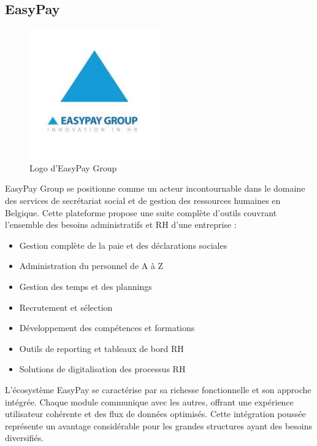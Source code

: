 \subsection{EasyPay}

\begin{figure}[H]
    \centering
    \includegraphics[width=0.5\textwidth]{easyPayLogo.jpeg}
    \caption{Logo d'EasyPay Group \cite{easypay}}
    \label{fig:easyPayLogo}
\end{figure}

\noindent EasyPay Group se positionne comme un acteur incontournable dans le domaine des services de secrétariat social et de gestion des ressources humaines en Belgique. Cette plateforme propose une suite complète d'outils couvrant l'ensemble des besoins administratifs et RH d'une entreprise :

\begin{itemize}[leftmargin=*,label=\textcolor{darkgray}{$\bullet$},itemsep=0.3em]
  \item Gestion complète de la paie et des déclarations sociales
  \item Administration du personnel de A à Z
  \item Gestion des temps et des plannings
  \item Recrutement et sélection
  \item Développement des compétences et formations
  \item Outils de reporting et tableaux de bord RH
  \item Solutions de digitalisation des processus RH
\end{itemize}

\vspace{0.5cm}

\noindent L'écosystème EasyPay se caractérise par sa richesse fonctionnelle et son approche intégrée. Chaque module communique avec les autres, offrant une expérience utilisateur cohérente et des flux de données optimisés. Cette intégration poussée représente un avantage considérable pour les grandes structures ayant des besoins diversifiés.

